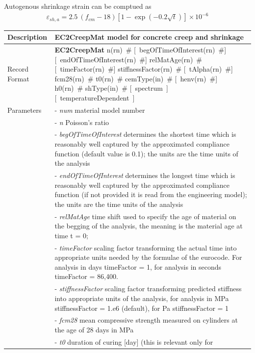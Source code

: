 \documentclass[a4paper]{article}
\newcommand{\descitem}[1]{{\noindent \bf #1}}
\newcommand{\elemparam}[2]{{{#1\tiny (#2)}~\#}}
\newcommand{\optelemparam}[2]{[{~\elemparam{#1}{#2}}]}
\newcommand{\elemstring}[1]{{#1}}
\newcommand{\optelemstring}[1]{[{~\elemstring{#1}~}]}
\newcommand{\param}[1]{{\it #1}}
\newenvironment{mmt}{\begin{tabular}{|l|p{9cm}|}}{\end{tabular}\\}
\newenvironment{mmt}{\begin{tabular}{|l|l|}}{\end{tabular}\\}
\begin{document}
Autogenous shrinkage strain can be comptued as
\begin{eqnarray}
\varepsilon_{sh,a} = 2.5 \: (f_{cm} - 18) \left[ 1- \exp \left( -0.2 \sqrt{t} \right)  \right] \times 10^{-6}
\end{eqnarray}


\begin{table}[!htb]
\begin{mmt}
\hline
Description & EC2CreepMat model  for concrete creep and shrinkage\\
\hline
Record Format & \descitem{EC2CreepMat}  
\elemparam{n}{rn}
\optelemparam{begOfTimeOfInterest}{rn}
\optelemparam{endOfTimeOfInterest}{rn}
\elemparam{relMatAge}{rn} 
\optelemparam{timeFactor}{rn}
\elemparam{stiffnessFactor}{rn}
\optelemparam{tAlpha}{rn}
\elemparam{fcm28}{rn}
\elemparam{t0}{rn}
\elemparam{cemType}{in}
\optelemparam{henv}{rn}
\elemparam{h0}{rn}
\elemparam{shType}{in}
\optelemstring{spectrum}
\optelemstring{temperatureDependent}\\
Parameters &- \param{num} material model number\\
&- \param{n} Poisson's ratio\\
&- \param{begOfTimeOfInterest} determines the shortest time which is
reasonably well captured by the approximated compliance function (default
value is 0.1); the units are the time units of the analysis\\
&- \param{endOfTimeOfInterest} determines the longest time which is
reasonably well captured by the approximated compliance function (if not
provided it is read from the engineering model); the units are the time units of the analysis\\
&- \param{relMatAge} time shift used to specify the age of material on
the begging of the analysis, the meaning is the material age at time t =
0;\\
&- \param{timeFactor} scaling factor transforming the actual time into
appropriate units needed by the formulae of the eurocode. For analysis
in days timeFactor = 1, for analysis in seconds timeFactor = 86,400.\\
&- \param{stiffnessFactor} scaling factor transforming predicted
stiffness into appropriate units of the analysis, for analysis in MPa
stiffnessFactor = 1.e6 (default), for Pa stiffnessFactor = 1\\
&- \param{fcm28} mean compressive strength measured on cylinders at
the age of 28 days in MPa\\
&- \param{t0} duration of curing [day] (this is relevant only for

\end{mmt}
\end{table}
\end{document}
